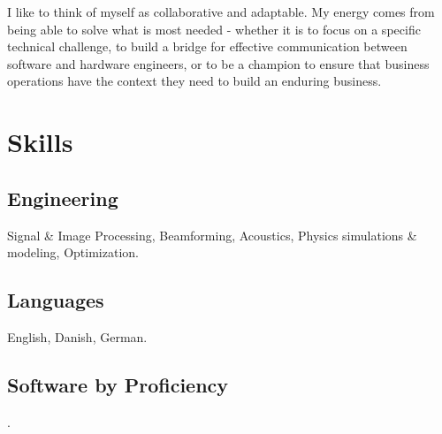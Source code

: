 \documentclass[8pt]{mofiicv}
\begin{document}
\begin{minipage}[T]{\FirstColumnWidth}
	I like to think of myself as collaborative and adaptable. My energy comes from being able to solve what is most needed - whether it is to focus on a specific technical challenge, to build a bridge for effective communication between software and hardware engineers, or to be a champion to ensure that business operations have the context they need to build an enduring business. 

	\vspace*{2em}
	\section{Skills}
	\subsection{Engineering} Signal \& Image Processing, Beamforming, Acoustics, Physics simulations \& modeling, Optimization.
	\subsection{Languages} English, Danish, German. 

	\subsection{Software by Proficiency}
	\textcolor{sand2}{.}%
	\null\vspace*{1\baselineskip}
	\begin{barchart}{4}
	\end{barchart}
	\end{minipage}
	\hspace*{\ColSep}
\end{document}
